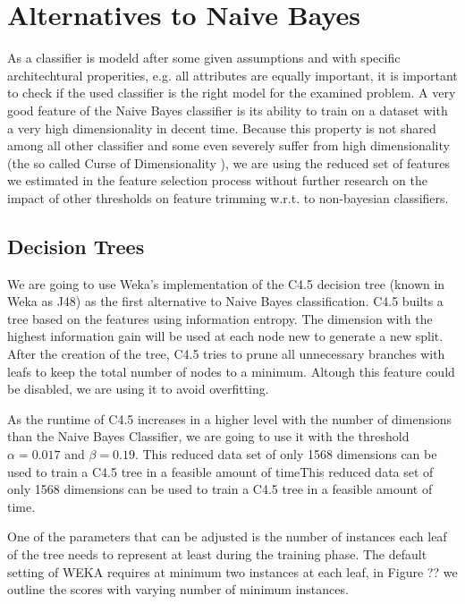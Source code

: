 \section{Alternatives to Naive Bayes}
As a classifier is modeld after some given assumptions and with specific architechtural properities, e.g. all attributes are equally important, it is important to check if the used classifier is the right model for the examined problem.
A very good feature of the Naive Bayes classifier is its ability to train on a dataset with a very high dimensionality in decent time.
Because this property is not shared among all other classifier and some even severely suffer from high dimensionality (the so called Curse of Dimensionality \cite{bellman1957dynamic}), we are using the reduced set of features we estimated in the feature selection process without further research on the impact of other thresholds on feature trimming w.r.t. to non-bayesian classifiers.

\subsection{Decision Trees}

We are going to use Weka's \cite{hall2009weka} implementation of the C4.5 decision tree \cite{Quinlan1993} (known in Weka as J48) as the first alternative to Naive Bayes classification.
C4.5 builts a tree based on the features using information entropy.
The dimension with the highest information gain will be used at each node new to generate a new split.
After the creation of the tree, C4.5 tries to prune all unnecessary branches with leafs to keep the total number of nodes to a minimum.
Altough this feature could be disabled, we are using it to avoid overfitting.

As the runtime of C4.5 increases in a higher level with the number of dimensions than the Naive Bayes Classifier, we are going to use it with the threshold $\alpha=0.017$ and $\beta=0.19$.
This reduced data set of only 1568 dimensions can be used to train a C4.5 tree in a feasible amount of timeThis reduced data set of only 1568 dimensions can be used to train a C4.5 tree in a feasible amount of time.

One of the parameters that can be adjusted is the number of instances each leaf of the tree needs to represent at least during the training phase.
The default setting of WEKA requires at minimum two instances at each leaf, in Figure ?? we outline the scores with varying number of minimum instances.



